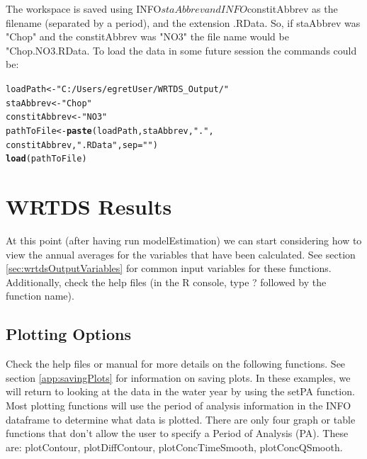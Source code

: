 \documentclass[a4paper,11pt]{article}\usepackage[]{graphicx}\usepackage[]{color}
\makeatletter
\newcommand{\hlstr}[1]{\textcolor[rgb]{0.192,0.494,0.8}{#1}}%
\newcommand{\hlstd}[1]{\textcolor[rgb]{0.345,0.345,0.345}{#1}}%
\newcommand{\hlkwb}[1]{\textcolor[rgb]{0.69,0.353,0.396}{#1}}%
\newcommand{\hlkwc}[1]{\textcolor[rgb]{0.333,0.667,0.333}{#1}}%
\newcommand{\hlkwd}[1]{\textcolor[rgb]{0.737,0.353,0.396}{\textbf{#1}}}%
\newenvironment{kframe}{%
 \def\at@end@of@kframe{}%
 \ifinner\ifhmode%
  \def\at@end@of@kframe{\end{minipage}}%
  \begin{minipage}{\columnwidth}%
 \fi\fi%
 \def\FrameCommand##1{\hskip\@totalleftmargin \hskip-\fboxsep
 \colorbox{shadecolor}{##1}\hskip-\fboxsep
     \hskip-\linewidth \hskip-\@totalleftmargin \hskip\columnwidth}%
 \MakeFramed {\advance\hsize-\width
   \@totalleftmargin\z@ \linewidth\hsize
   \@setminipage}}%
 {\par\unskip\endMakeFramed%
 \at@end@of@kframe}
\newenvironment{knitrout}{}{} %
\makeatother
\begin{document}
The workspace is saved using INFO$staAbbrev and INFO$constitAbbrev as the filename (separated by a period), and the extension .RData. So, if staAbbrev was "Chop" and the constitAbbrev was "NO3" the file name would be "Chop.NO3.RData. To load the data in some future session the commands could be:

\begin{knitrout}
\color{fgcolor}\begin{kframe}
\begin{alltt}
\hlstd{loadPath} \hlkwb{<-} \hlstr{"C:/Users/egretUser/WRTDS_Output/"}
\hlstd{staAbbrev} \hlkwb{<-} \hlstr{"Chop"}
\hlstd{constitAbbrev} \hlkwb{<-} \hlstr{"NO3"}
\hlstd{pathToFile} \hlkwb{<-} \hlkwd{paste}\hlstd{(loadPath,staAbbrev,}\hlstr{"."}\hlstd{,}
                    \hlstd{constitAbbrev,}\hlstr{".RData"}\hlstd{,}\hlkwc{sep}\hlstd{=}\hlstr{""}\hlstd{)}
\hlkwd{load}\hlstd{(pathToFile)}
\end{alltt}
\end{kframe}
\end{knitrout}



\FloatBarrier

\section{WRTDS Results}
\label{sec:wrtdsResults}
At this point (after having run modelEstimation) we can start considering how to view the annual averages for the variables that have been calculated.  See section \ref{sec:wrtdsOutputVariables} for common input variables for these functions. Additionally, check the help files (in the R console, type ? followed by the function name). 

\subsection{Plotting Options}
\label{sec:wrtdsPlotting}

\FloatBarrier

Check the help files or manual for more details on the following functions.  See section \ref{app:savingPlots} for information on saving plots. In these examples, we will return to looking at the data in the water year by using the setPA function. Most plotting functions will use the period of analysis information in the INFO dataframe to determine what data is plotted. There are only four graph or table functions that don't allow the user to specify a Period of Analysis (PA). These are: plotContour, plotDiffContour, plotConcTimeSmooth, plotConcQSmooth.
\end{document}
